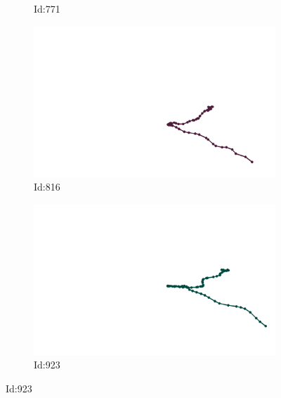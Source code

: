 \documentclass[12pt,twoside]{report}
\begin{document}
\begin{figure}
\begin{subfigure}[b]{0.20\textwidth}
\caption{Id:771}
\end{subfigure}
\begin{subfigure}[b]{0.20\textwidth}
\centering
\includegraphics[width=\textwidth]{../../trajectories/816.png}
\caption{Id:816}
\end{subfigure}
\begin{subfigure}[b]{0.20\textwidth}
\centering
\includegraphics[width=\textwidth]{../../trajectories/923.png}
\caption{Id:923}
\end{subfigure}
\end{figure}
\end{document}
